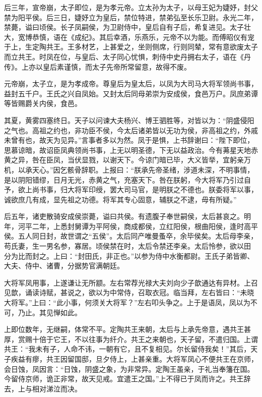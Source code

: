 \documentclass[12pt,UTF8]{ctexbook}
\begin{document}
后三年，宣帝崩，太子即位，是为孝元帝。立太孙为太子，以母王妃为婕妤，封父禁为阳平侯。后三日，婕妤立为皇后，禁位特进，禁弟弘至长乐卫尉。永光二年，禁薨，谥曰顷侯。长子凤嗣侯，为卫尉侍中，皇后自有子后，希复进见。太子壮大，宽博恭慎，语在《成纪》。其后幸酒，乐燕乐，元帝不以为能。而傅昭仪有宠于上，生定陶共王。王多材艺，上甚爱之，坐则侧席，行则同辇，常有意欲废太子而立共王。时凤在位，与皇后、太子同心忧惧，刺侍中史丹拥右太子，语在《丹传》。上亦以皇后素谨慎，而太子先帝所常留意，故得不废。



元帝崩，太子立，是为孝成帝。尊皇后为皇太后，以凤为大司马大将军领尚书事，益封五千户。王氏之兴自凤始。又封太后同母弟崇为安成侯，食邑万户。凤庶弟谭等皆赐爵关内侯，食邑。



其夏，黄雾四塞终日。天子以问谏大夫杨兴、博王驷胜等，对皆以为：“阴盛侵阳之气也。高祖之约也，非功臣不侯，今太后诸弟皆以无功为侯，非高祖之约，外戚未曾有也，故天为见异。”言事者多以为然。凤于是惧，上书辞谢曰：“陛下即位，思慕谅暗，故诏臣凤典领尚书事，上无以明圣德，下无以益政治。今有茀星天地赤黄之异，咎在臣凤，当伏显戮，以谢天下。今谅门暗已毕，大义皆举，宜躬亲万机，以承天心。”因乞骸骨辞职。上报曰：“朕承先帝圣绪，涉道未深，不明事情，是以阴阳错缪，日月无光，赤黄之气，充塞天下。咎在朕躬，今大将军乃引过自予，欲上尚书事，归大将军印绶，罢大司马官，是明朕之不德也。朕委将军以事，诚欲庶几有成，显先祖之功德。将军其专心固意，辅朕之不逮，毋有所疑。”



后五年，诸吏散骑安成侯崇薨，谥曰共侯。有遗腹子奉世嗣侯，太后甚哀之。明年，河平二年，上悉封舅谭为平阿侯，商成都侯，立红阳侯，根曲阳侯，逢时高平侯。五人同日封，故世谓之“五侯”。太后同产唯曼蚤卒，余毕侯矣。太后母李亲，苟氏妻，生一男名参，寡居。顷侯禁在时，太后令禁还李亲。太后怜参，欲以田分为比而封之。上曰：“封田氏，非正也。”以参为侍中水衡都尉。王氏子弟皆卿、大夫、侍中、诸曹，分据势官满朝廷。



大将军凤用事，上遂谦让无所颛。左右常荐光禄大夫刘向少子歆通达有异材。上召见歆，诵读诗赋，甚说之，欲以为中常侍，召取衣冠。临当拜，左右皆曰：“未晓大将军。”上曰：“此小事，何须关大将军？”左右叩头争之。上于是语凤，凤以为不可，乃止。其见惮如此。



上即位数年，无继嗣，体常不平。定陶共王来朝，太后与上承先帝意，遇共王甚厚，赏赐十倍于它王，不以往事为纤介。共王之来朝也，天子留，不遣归国。上谓共王：“我未有子，人命不讳，一朝有它，且不复相见。尔长留侍我矣！”其后，天子疾益有瘳，共王因留国邸，旦夕侍上，上甚亲重。大将军凤心不便共王在京师，会日蚀，凤因言：“日蚀，阴盛之象，为非常异。定陶王虽亲，于礼当奉籓在国。今留侍京师，诡正非常，故天见戒。宜遣王之国。”上不得已于凤而许之。共王辞去，上与相对涕泣而决。
\end{document}

